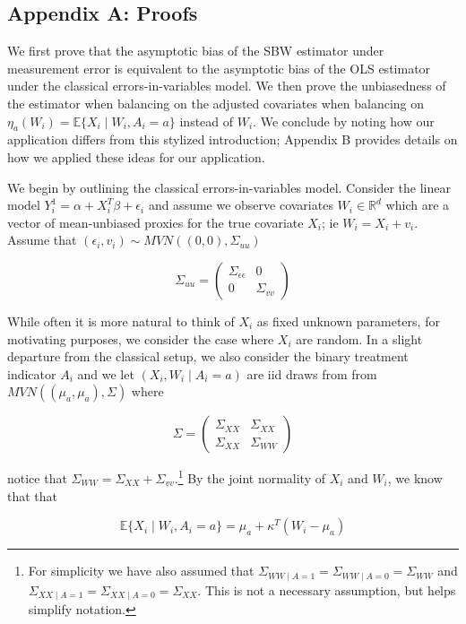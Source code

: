 \documentclass[12pt]{article}
\begin{document}
\subsection{Appendix A: Proofs}

We first prove that the asymptotic bias of the SBW estimator under measurement error is equivalent to the asymptotic bias of the OLS estimator under the classical errors-in-variables model. We then prove the unbiasedness of the estimator when balancing on the adjusted covariates when balancing on $\eta_a(W_i) = \mathbb{E}\{X_i \mid W_i, A_i = a\}$ instead of $W_i$. We conclude by noting how our application differs from this stylized introduction; Appendix B provides details on how we applied these ideas for our application.

We begin by outlining the classical errors-in-variables model. Consider the linear model $Y_i^1 = \alpha + X_i^T\beta + \epsilon_i$ and assume we observe covariates $W_i \in \mathbb{R}^d$ which are a vector of mean-unbiased proxies for the true covariate $X_i$; ie $W_i = X_i + v_i$. Assume that $(\epsilon_i, v_i) \sim MVN((0,0), \Sigma_{uu})$ 

$$
\Sigma_{uu} = \begin{pmatrix} 
\Sigma_{\epsilon\epsilon} & 0 \\ 
0 & \Sigma_{vv} 
\end{pmatrix}
$$ 

While often it is more natural to think of $X_i$ as fixed unknown parameters, for motivating purposes, we consider the case where $X_i$ are random. In a slight departure from the classical setup, we also consider the binary treatment indicator $A_i$ and we let $(X_i, W_i \mid A_i = a)$ are iid draws from from $MVN((\mu_a, \mu_a), \Sigma)$ where 

$$
\Sigma = \begin{pmatrix} 
\Sigma_{XX} & \Sigma_{XX} \\ 
\Sigma_{XX} & \Sigma_{WW}  
\end{pmatrix}
$$ 

notice that $\Sigma_{WW} = \Sigma_{XX} + \Sigma_{vv}$.\footnote{For simplicity we have also assumed that $\Sigma_{WW \mid A = 1} = \Sigma_{WW \mid A = 0} = \Sigma_{WW}$ and $\Sigma_{XX \mid A = 1} = \Sigma_{XX \mid A = 0} = \Sigma_{XX}$. This is not a necessary assumption, but helps simplify notation.} By the joint normality of $X_i$ and $W_i$, we know that that 

$$
\mathbb{E}\{X_i \mid W_i, A_i = a\} = \mu_a + \kappa^T(W_i - \mu_a)
$$
\end{document}
